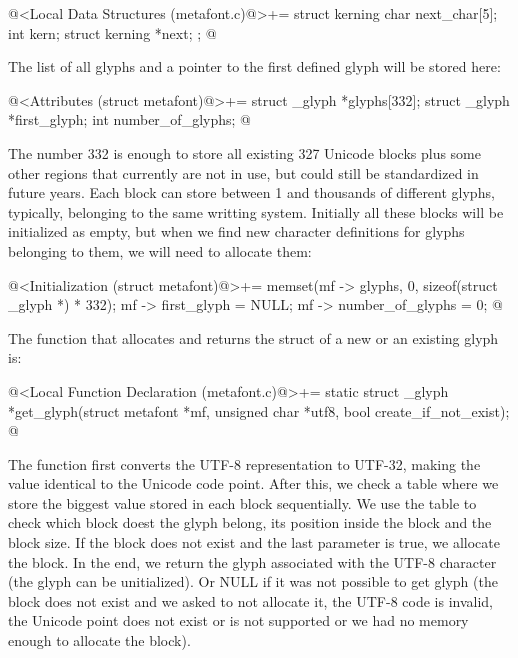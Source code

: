 {{{{{\iniciocodigo
@<Local Data Structures (metafont.c)@>+=
struct kerning{
  char next_char[5];
  int kern;
  struct kerning *next;
};
@
\fimcodigo


The list of all glyphs and a pointer to the first defined glyph will
be stored here:

\iniciocodigo
@<Attributes (struct metafont)@>+=
struct _glyph *glyphs[332];
struct _glyph *first_glyph;
int number_of_glyphs;
@
\fimcodigo

The number 332 is enough to store all existing 327 Unicode blocks plus
some other regions that currently are not in use, but could still be
standardized in future years. Each block can store between 1 and
thousands of different glyphs, typically, belonging to the same
writting system. Initially all these blocks will be initialized as
empty, but when we find new character definitions for glyphs belonging
to them, we will need to allocate them:

\iniciocodigo
@<Initialization (struct metafont)@>+=
memset(mf -> glyphs, 0, sizeof(struct _glyph *) * 332);
mf -> first_glyph = NULL;
mf -> number_of_glyphs = 0;
@
\fimcodigo

The function that allocates and returns the struct of a new or an
existing glyph is:

\iniciocodigo
@<Local Function Declaration (metafont.c)@>+=
static struct _glyph *get_glyph(struct metafont *mf, unsigned char *utf8,
                                bool create_if_not_exist);
@
\fimcodigo

The function first converts the UTF-8 representation to UTF-32, making
the value identical to the Unicode code point. After this, we check a
table where we store the biggest value stored in each block
sequentially. We use the table to check which block doest the glyph
belong, its position inside the block and the block size. If the block
does not exist and the last parameter is true, we allocate the
block. In the end, we return the glyph associated with the UTF-8
character (the glyph can be unitialized). Or NULL if it was not
possible to get glyph (the block does not exist and we asked to not
allocate it, the UTF-8 code is invalid, the Unicode point does not
exist or is not supported or we had no memory enough to allocate the
block).


}}}}}
